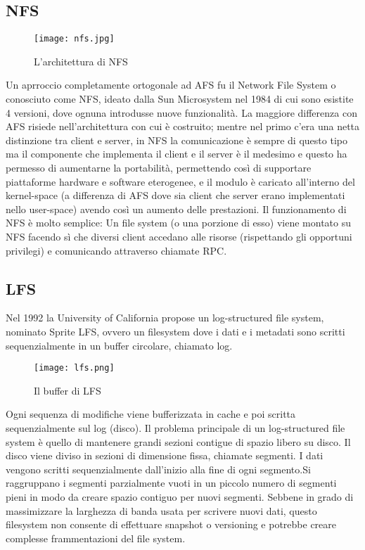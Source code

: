 \subsection{NFS}
\begin{figure}[ht]
  \begin{center}
    \texttt{[image: nfs.jpg]}
    \caption{L'architettura di NFS}
    \label{hyp}
  \end{center}
\end{figure}
Un aprroccio completamente ortogonale ad AFS fu il Network File System o conosciuto come NFS, ideato dalla Sun Microsystem nel 1984 di cui sono esistite 4 versioni, dove ognuna introdusse nuove funzionalità. La maggiore differenza con AFS risiede nell'architettura con cui è costruito; mentre nel primo c'era una netta distinzione tra client e server, in NFS la comunicazione è sempre di questo tipo ma il componente che implementa il client e il server è il medesimo e questo ha permesso di aumentarne la portabilità, permettendo così di supportare piattaforme hardware e software eterogenee, e il modulo è caricato all'interno del kernel-space (a differenza di AFS dove sia client che server erano implementati nello user-space) avendo così un aumento delle prestazioni. Il funzionamento di NFS è molto semplice: Un file system (o una porzione di esso) viene montato su NFS facendo sì che diversi client accedano alle risorse (rispettando gli opportuni privilegi) e comunicando attraverso chiamate RPC.
\subsection{LFS}
Nel 1992 la University of California propose un log-structured file system, nominato Sprite LFS, ovvero un filesystem dove i dati e i metadati sono scritti sequenzialmente in un buffer circolare, chiamato log. \\
\begin{figure}[ht]
  \begin{center}
    \texttt{[image: lfs.png]}
    \caption{Il buffer di LFS}
    \label{hyp}
  \end{center}
\end{figure}
Ogni sequenza di modifiche viene bufferizzata in cache e poi scritta sequenzialmente sul log (disco). Il problema principale di un log-structured file system è quello di mantenere grandi sezioni contigue di spazio libero su disco. Il disco viene diviso in sezioni di dimensione fissa, chiamate segmenti. I dati vengono scritti sequenzialmente dall'inizio alla fine di ogni segmento.Si raggruppano i segmenti parzialmente vuoti in un piccolo numero di segmenti pieni in modo da creare spazio contiguo per nuovi segmenti. Sebbene in grado di massimizzare la larghezza di banda usata per scrivere nuovi dati, questo filesystem non consente di effettuare snapshot o versioning e potrebbe creare complesse frammentazioni del file system.
